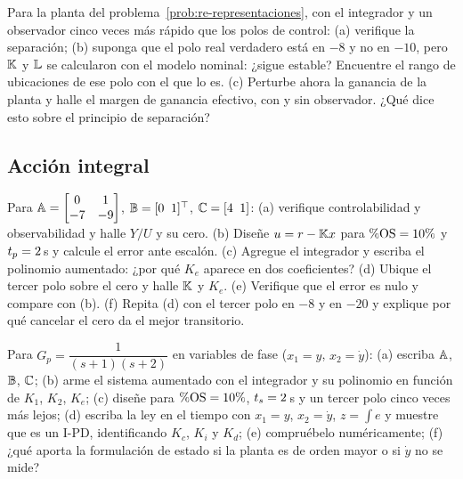 \begin{problema}\label{prob:re-robustez}
\etiquetaEstrella{}\etiquetaM{} Para la planta del problema~\ref{prob:re-representaciones}, con el integrador y un observador cinco veces más rápido que los polos de control: (a) verifique la separación; (b) suponga que el polo real verdadero está en $-8$ y no en $-10$, pero $\mathbb{K}$ y $\mathbb{L}$ se calcularon con el modelo nominal: ¿sigue estable? Encuentre el rango de ubicaciones de ese polo con el que lo es. (c) Perturbe ahora la ganancia de la planta y halle el margen de ganancia efectivo, con y sin observador. ¿Qué dice esto sobre el principio de separación?
\end{problema}

\subsection*{Acción integral}

\begin{problema}\label{prob:re-integralcero}
Para $\mathbb{A}=\begin{bmatrix}0&1\\-7&-9\end{bmatrix}$, $\mathbb{B}=[0\;\;1]^\top$, $\mathbb{C}=[4\;\;1]$: (a) verifique controlabilidad y observabilidad y halle $Y/U$ y su cero. (b) Diseñe $u=r-\mathbb{K} x$ para $\%\mathrm{OS}=10\%$ y $t_p=2$\,s y calcule el error ante escalón. (c) Agregue el integrador y escriba el polinomio aumentado: ¿por qué $K_e$ aparece en dos coeficientes? (d) Ubique el tercer polo sobre el cero y halle $\mathbb{K}$ y $K_e$. (e) \etiquetaM{} Verifique que el error es nulo y compare con (b). (f) Repita (d) con el tercer polo en $-8$ y en $-20$ y explique por qué cancelar el cero da el mejor transitorio.
\end{problema}

\begin{problema}\label{prob:re-ipd}
Para $G_p=\dfrac{1}{(s+1)(s+2)}$ en variables de fase ($x_1=y$, $x_2=\dot y$): (a) escriba $\mathbb{A}$, $\mathbb{B}$, $\mathbb{C}$; (b) arme el sistema aumentado con el integrador y su polinomio en función de $K_1$, $K_2$, $K_e$; (c) diseñe para $\%\mathrm{OS}=10\%$, $t_s=2$\,s y un tercer polo cinco veces más lejos; (d) escriba la ley en el tiempo con $x_1=y$, $x_2=\dot y$, $z=\int e$ y muestre que es un I-PD, identificando $K_c$, $K_i$ y $K_d$; (e) \etiquetaM{} compruébelo numéricamente; (f) ¿qué aporta la formulación de estado si la planta es de orden mayor o si $\dot y$ no se mide?
\end{problema}

